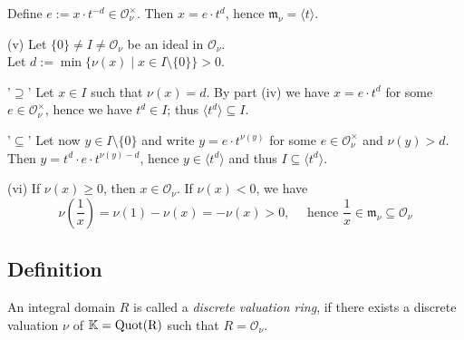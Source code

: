 \documentclass[12pt]{book}
\begin{document}
\begin{spacing}{1.3}
\begin{compactenum}
Define $e:= x \cdot t^{-d} \in \mathcal{O}_{\nu}^{\times}$. Then $x=e \cdot t^d$, hence $\mathfrak{m}_{\nu}=\langle t \rangle$.
\item[(v)] Let $\{0\}\neq I \neq \mathcal{O}_{\nu}$ be an ideal in $\mathcal{O}_{\nu}$.\\
Let $d:= \min\{ \nu(x) \mid x \in I \setminus \{0\} \} >0$. 
\begin{compactitem}
\item['$\supseteq$'] Let $x \in I$ such that $\nu(x)=d$. By part (iv) we have $x=e \cdot t^d$ for some $e \in \mathcal{O}_{\nu}^{\times}$, hence we have $t^d \in I$; thus $\langle t^d \rangle \subseteq I$.
\item['$\subseteq$'] Let now $y \in I \setminus \{0\}$ and write $y= e \cdot t^{\nu(y)}$ for some $e \in \mathcal{O}_{\nu}^{\times}$ and $\nu(y)>d$.\\
Then $y=t^d \cdot e \cdot t^{\nu(y)-d}$, hence $y \in \langle t^d \rangle$ and thus $I \subseteq \langle t^d \rangle$.
\end{compactitem}
\item[(vi)] If $\nu(x) \geqslant 0$, then $x \in \mathcal{O}_{\nu}$. If $\nu(x)<0$, we have
$$\nu\left(\frac{1}{x}\right)= \nu(1)-\nu(x)=-\nu(x)>0, \quad \textrm{ hence } \frac{1}{x} \in \mathfrak{m}_{\nu} \subseteq \mathcal{O}_{\nu}$$
\end{compactenum}

\subsection{Definition} %
An integral domain $R$ is called a \textit{discrete valuation ring}, if there exists a discrete valuation $\nu$ of $\mathbb{K}=\rm{Quot}(R)$ such that $R=\mathcal{O}_{\nu}$.


\end{spacing}
\end{document}
